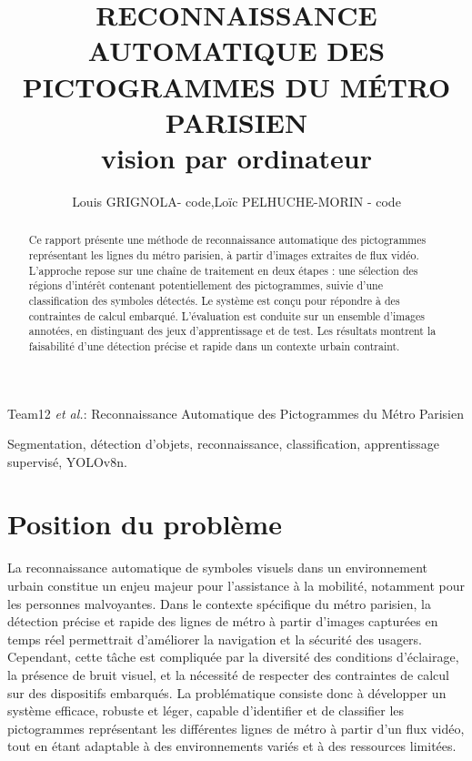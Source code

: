 \documentclass[journal]{IEEEtran}
\begin{document}
\title{RECONNAISSANCE AUTOMATIQUE DES PICTOGRAMMES DU MÉTRO PARISIEN \\
\small{vision par ordinateur}}

\author{Louis GRIGNOLA- code,Loïc PELHUCHE-MORIN  - code}%
        
{Team12 \MakeLowercase{\textit{et al.}}: Reconnaissance Automatique des Pictogrammes du Métro Parisien}

\maketitle

\begin{abstract} 
Ce rapport présente une méthode de reconnaissance automatique des pictogrammes représentant les lignes du métro parisien, à partir d'images extraites de flux vidéo. L'approche repose sur une chaîne de traitement en deux étapes : une sélection des régions d'intérêt contenant potentiellement des pictogrammes, suivie d'une classification des symboles détectés. Le système est conçu pour répondre à des contraintes de calcul embarqué. L'évaluation est conduite sur un ensemble d'images annotées, en distinguant des jeux d'apprentissage et de test. Les résultats montrent la faisabilité d'une détection précise et rapide dans un contexte urbain contraint.
\end{abstract}

\begin{IEEEkeywords}
Segmentation, détection d'objets, reconnaissance, classification, apprentissage supervisé, YOLOv8n.
\end{IEEEkeywords}



\section{Position du problème}

La reconnaissance automatique de symboles visuels dans un environnement urbain constitue un enjeu majeur pour l'assistance à la mobilité, notamment pour les personnes malvoyantes. Dans le contexte spécifique du métro parisien, la détection précise et rapide des lignes de métro à partir d'images capturées en temps réel permettrait d'améliorer la navigation et la sécurité des usagers. Cependant, cette tâche est compliquée par la diversité des conditions d'éclairage, la présence de bruit visuel, et la nécessité de respecter des contraintes de calcul sur des dispositifs embarqués. La problématique consiste donc à développer un système efficace, robuste et léger, capable d'identifier et de classifier les pictogrammes représentant les différentes lignes de métro à partir d'un flux vidéo, tout en étant adaptable à des environnements variés et à des ressources limitées.
\end{document}
